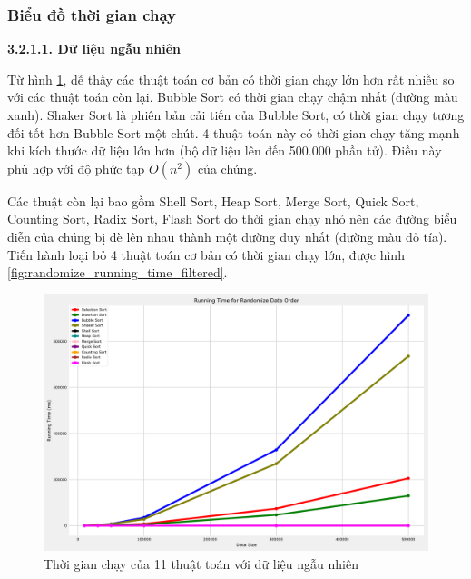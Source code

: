 \subsubsection{Biểu đồ thời gian chạy}

\textbf{3.2.1.1. Dữ liệu ngẫu nhiên}

Từ hình \ref{fig:randomize_running_time}, dễ thấy các thuật toán cơ bản có thời gian chạy lớn hơn rất nhiều so với các thuật toán còn lại. Bubble Sort có thời gian chạy chậm nhất (đường màu xanh). Shaker Sort là phiên bản cải tiến của Bubble Sort, có thời gian chạy tương đối tốt hơn Bubble Sort một chút. 4 thuật toán này có thời gian chạy tăng mạnh khi kích thước dữ liệu lớn hơn (bộ dữ liệu lên đến 500.000 phần tử). Điều này phù hợp với độ phức tạp $O(n^2)$ của chúng.


Các thuật còn lại bao gồm Shell Sort, Heap Sort, Merge Sort, Quick Sort, Counting Sort, Radix Sort, Flash Sort do thời gian chạy nhỏ nên các đường biểu diễn của chúng bị đè lên nhau thành một đường duy nhất (đường màu đỏ tía). Tiến hành loại bỏ 4 thuật toán cơ bản có thời gian chạy lớn, được hình \ref{fig:randomize_running_time_filtered}.

\begin{figure}[H]
    \centering
    \includegraphics[width=\textwidth]{experimental_result/images/randomize_running_time.png}
    \caption{Thời gian chạy của 11 thuật toán với dữ liệu ngẫu nhiên}
    \label{fig:randomize_running_time}
\end{figure}



